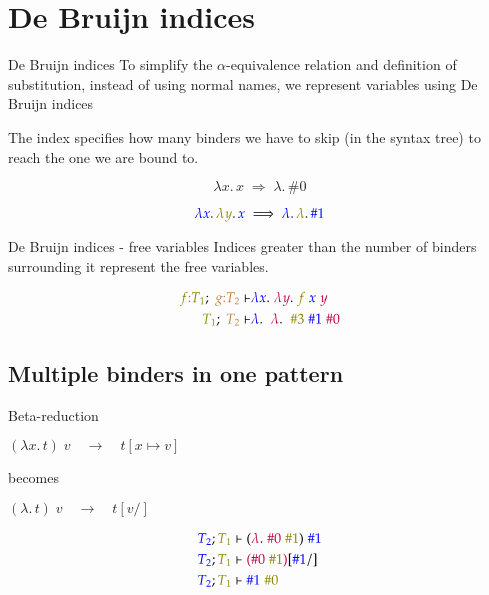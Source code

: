 \documentclass{beamer}
\newcommand{\tpd}[2]{{#1}{:}{#2}}
\begin{document}
\section{De Bruijn indices}
\begin{frame}{De Bruijn indices}
To simplify the $\alpha$-equivalence relation and definition of substitution, instead of using normal names, we represent variables using De Bruijn indices

The index specifies how many binders we have to skip (in the syntax tree) to reach the one we are bound to.

\begin{equation*}
  \lambda x. \, x \; \Longrightarrow \; \lambda. \, \#0
\end{equation*}

\begin{equation*}
{\color{blue}\lambda x}. \, {\color{olive}\lambda y}. \, {\color{blue}x} \; \Longrightarrow \; {\color{blue}\lambda}. \, {\color{olive}\lambda}. \, {\color{blue}\#1}
\end{equation*}

\end{frame}

\begin{frame}{De Bruijn indices - free variables}
Indices greater than the number of binders surrounding it represent the free variables.

\begin{align*}
{\color{olive}\tpd{f}{T_1}}; \; {\color{brown}\tpd{g}{T_2}} \vdash & {\color{blue} \lambda x}. \; {\color{purple}\lambda y}. \; {\color{olive}f} \; {\color{blue}x} \; {\color{purple}y} \\
{\color{olive} T_1}; \; {\color{brown}T_2} \vdash & {\color{blue} \lambda}. \;\; {\color{purple}\lambda}. \;\; {\color{olive} \#3} \; {\color{blue}\#1} \; {\color{purple} \#0}
\end{align*}


\end{frame}

\subsection{Multiple binders in one pattern}
\begin{frame}{Beta-reduction}

$(\lambda x. \, t) \; v \quad \longrightarrow \quad t[x \mapsto v]$

becomes

$(\lambda. \, t) \; v \quad \longrightarrow \quad t[v/]$

\begin{align*}
{\color{blue}T_2}; {\color{olive}T_1} &\vdash ({\color{purple}\lambda}. \; {\color{purple}\#0} \; {\color{olive}\#1}) \; {\color{blue}\#1} \\
{\color{blue}T_2}; {\color{olive}T_1} &\vdash {\color{purple}({\color{purple}\#0} \; {\color{olive}\#1})}[{\color{blue}\#1}/] \\
{\color{blue}T_2}; {\color{olive}T_1} &\vdash {\color{blue}\#1} \; {\color{olive}\#0}
\end{align*}
\end{frame}
\end{document}
